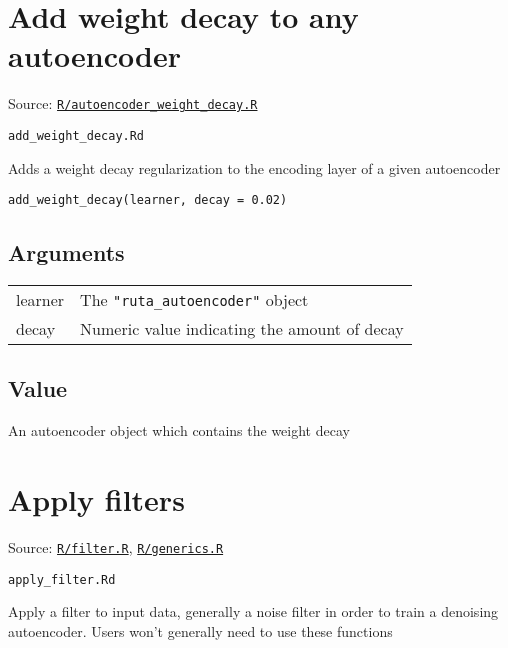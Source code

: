 \section{Add weight decay to any
autoencoder}\label{add-weight-decay-to-any-autoencoder}

Source:
\href{https://github.com/fdavidcl/ruta/blob/master/R/autoencoder_weight_decay.R}{\texttt{R/autoencoder\_weight\_decay.R}}

\texttt{add\_weight\_decay.Rd}

Adds a weight decay regularization to the encoding layer of a given
autoencoder

\begin{verbatim}
add_weight_decay(learner, decay = 0.02)
\end{verbatim}

\hypertarget{arguments}{\subsection{\texorpdfstring{\protect\hyperlink{arguments}{}Arguments}{Arguments}}\label{arguments}}

\begin{longtable}[c]{@{}ll@{}}
\toprule
learner & The \texttt{"ruta\_autoencoder"} object\tabularnewline
decay & Numeric value indicating the amount of decay\tabularnewline
\bottomrule
\end{longtable}

\hypertarget{value}{\subsection{\texorpdfstring{\protect\hyperlink{value}{}Value}{Value}}\label{value}}

An autoencoder object which contains the weight decay

\section{Apply filters}\label{apply-filters}

Source:
\href{https://github.com/fdavidcl/ruta/blob/master/R/filter.R}{\texttt{R/filter.R}},
\href{https://github.com/fdavidcl/ruta/blob/master/R/generics.R}{\texttt{R/generics.R}}

\texttt{apply\_filter.Rd}

Apply a filter to input data, generally a noise filter in order to train
a denoising autoencoder. Users won't generally need to use these
functions

